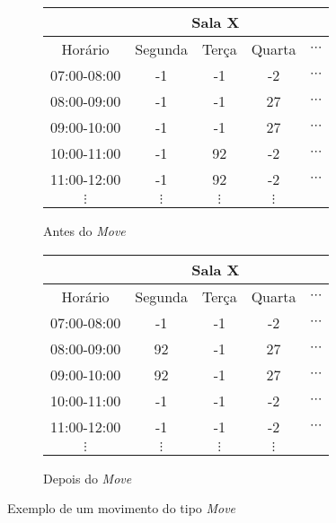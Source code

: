 \begin{figure}[h!]
    \tiny
    \begin{subfigure}[b]{0.5\textwidth}
    \centering
    \begin{tabular}{|c|c|c|c|c|}
        \hline
        & \multicolumn{3}{c|}{Sala X} &  \\ \hline
        Horário & Segunda & Terça & Quarta & $\cdots$ \\ \hline
        07:00-08:00 & -1 & -1 & -2 & $\cdots$ \\ \hline
        08:00-09:00 & -1 & -1 & 27 & $\cdots$ \\ \hline
        09:00-10:00 & -1 & -1 & 27 & $\cdots$ \\ \hline
        10:00-11:00 & -1 & \cellcolor[HTML]{FFCE93}92 & -2 & $\cdots$ \\ \hline
        11:00-12:00 & -1 & \cellcolor[HTML]{FFCE93}92 & -2 & $\cdots$ \\ \hline
        $\vdots$ & $\vdots$ & $\vdots$ & $\vdots$ &  \\ \hline
    \end{tabular}
    \caption{Antes do \textit{Move}}
    \label{move:a}
    \end{subfigure}
    \hfill
    \begin{subfigure}[b]{0.5\textwidth}
    \centering
    \begin{tabular}{|c|c|c|c|c|}
        \hline
        & \multicolumn{3}{c|}{Sala X} &  \\ \hline
        Horário & Segunda & Terça & Quarta & $\cdots$ \\ \hline
        07:00-08:00 & -1 & -1 & -2 & $\cdots$ \\ \hline
        08:00-09:00 & \cellcolor[HTML]{FFCE93}92 & -1 & 27 & $\cdots$ \\ \hline
        09:00-10:00 & \cellcolor[HTML]{FFCE93}92 & -1 & 27 & $\cdots$ \\ \hline
        10:00-11:00 & -1 & -1 & -2 & $\cdots$ \\ \hline
        11:00-12:00 & -1 & -1 & -2 & $\cdots$ \\ \hline
        $\vdots$ & $\vdots$ & $\vdots$ & $\vdots$ &  \\ \hline
    \end{tabular}
    \caption{Depois do \textit{Move}}
    \label{move:b}
    \end{subfigure}
    \caption{Exemplo de um movimento do tipo \textit{Move}}
    \label{move}
\end{figure}

